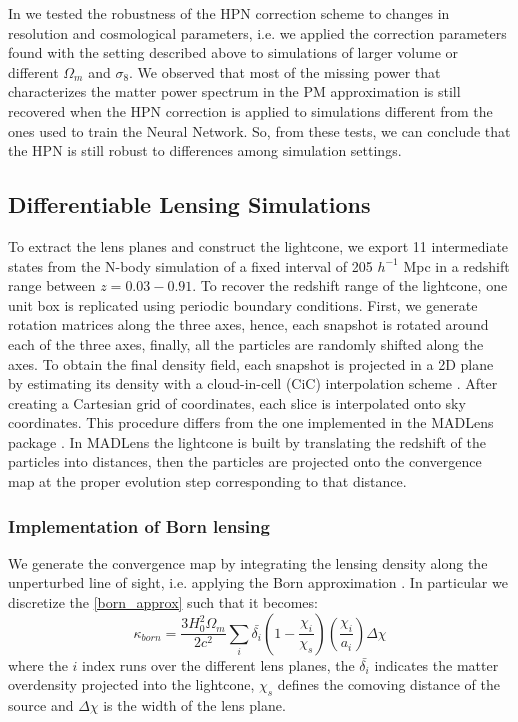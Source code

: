 \documentclass[twocolumn,twocolappendix]{aastex63}
\begin{document}
In \citet{lanzieri2022hybrid} we tested the robustness of the HPN correction scheme to changes in resolution and cosmological parameters, i.e. we applied the correction parameters found with the setting described above to simulations of larger volume or different $\Omega_m$ and $\sigma_8$. We observed that most of the missing power that characterizes the matter power spectrum in the PM approximation is still recovered when the HPN correction is applied to simulations different from the ones used to train the Neural Network. So, from these tests, we can conclude that the HPN is still robust to differences among simulation settings.


\subsection{Differentiable Lensing Simulations}
To extract the lens planes and construct the lightcone, we export 11 intermediate states from the N-body simulation of a fixed interval of 205 $h^{-1}$ Mpc in a redshift range between $z=0.03-0.91$. 
To recover the redshift range of the lightcone, one unit box is replicated using periodic boundary conditions. First, we generate rotation matrices along the three axes, hence, each snapshot is rotated around each of the three axes, finally, all the particles are randomly shifted along the axes. 
To obtain the final density field, each snapshot is projected in a 2D plane by estimating its density with a  cloud-in-cell (CiC) interpolation scheme \citep{hockney1988computer}. After creating a Cartesian grid of coordinates, each slice is interpolated onto sky coordinates. This procedure differs from the one implemented in the MADLens package \citep{bohm2021madlens}. In MADLens the lightcone is built by translating the redshift of the particles into distances, then the particles are projected onto the convergence map at the proper evolution step corresponding to that distance.



\subsubsection{Implementation of Born lensing}
We generate the convergence map by integrating the lensing density along the unperturbed line of sight, i.e. applying the Born approximation \citep{schneider2006weak}. In particular we discretize the \autoref{born_approx} such that it becomes:
\begin{equation} 
    \kappa_{born}= \frac{3H_0^2 \Omega_m}{2c^2}
    \sum_i 
    \bar{\delta_i} \left ( 1-\frac{\chi_i}{\chi_s}\right)
    \left (  \frac{\chi_i}{a_i}\right)
     \Delta \chi
\end{equation}
where the $i$ index runs over the different lens planes, the $\bar{\delta_i}$ indicates the matter overdensity projected into the lightcone, $\chi_s$ defines the comoving distance of the source and $\Delta \chi$ is the  width of the lens plane. 
\end{document}
